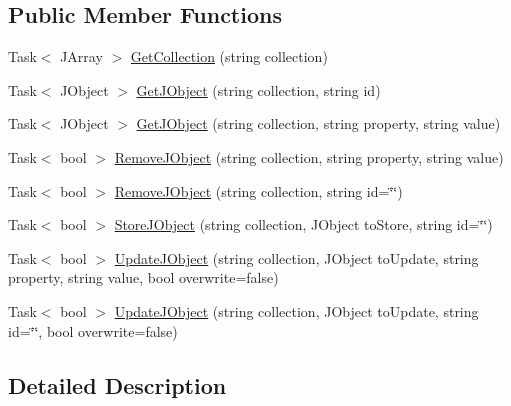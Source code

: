 \subsection*{Public Member Functions}
\begin{DoxyCompactItemize}
\item 
Task$<$ J\+Array $>$ \mbox{\hyperlink{interface_little_weeb_library_1_1_handlers_1_1_i_data_base_handler_a33ee83202d229f44d3839af7c1b65df0}{Get\+Collection}} (string collection)
\item 
Task$<$ J\+Object $>$ \mbox{\hyperlink{interface_little_weeb_library_1_1_handlers_1_1_i_data_base_handler_a6586c4d1cfebdb8d5d40bc544d51914c}{Get\+J\+Object}} (string collection, string id)
\item 
Task$<$ J\+Object $>$ \mbox{\hyperlink{interface_little_weeb_library_1_1_handlers_1_1_i_data_base_handler_a9d9a8fc06ab8431daa5363becf79cf65}{Get\+J\+Object}} (string collection, string property, string value)
\item 
Task$<$ bool $>$ \mbox{\hyperlink{interface_little_weeb_library_1_1_handlers_1_1_i_data_base_handler_a76b8da1f75749b16e095dc3d635cebdf}{Remove\+J\+Object}} (string collection, string property, string value)
\item 
Task$<$ bool $>$ \mbox{\hyperlink{interface_little_weeb_library_1_1_handlers_1_1_i_data_base_handler_a4d78b21102490d85906d0eb3f4693227}{Remove\+J\+Object}} (string collection, string id=\char`\"{}\char`\"{})
\item 
Task$<$ bool $>$ \mbox{\hyperlink{interface_little_weeb_library_1_1_handlers_1_1_i_data_base_handler_a5d87c42ef7dc7e5d86f7e6fada3454e9}{Store\+J\+Object}} (string collection, J\+Object to\+Store, string id=\char`\"{}\char`\"{})
\item 
Task$<$ bool $>$ \mbox{\hyperlink{interface_little_weeb_library_1_1_handlers_1_1_i_data_base_handler_a00c429576be33aa60bdf1a88edaf88c6}{Update\+J\+Object}} (string collection, J\+Object to\+Update, string property, string value, bool overwrite=false)
\item 
Task$<$ bool $>$ \mbox{\hyperlink{interface_little_weeb_library_1_1_handlers_1_1_i_data_base_handler_a30fbd69419ce902612a3c323b451f3fa}{Update\+J\+Object}} (string collection, J\+Object to\+Update, string id=\char`\"{}\char`\"{}, bool overwrite=false)
\end{DoxyCompactItemize}


\subsection{Detailed Description}


